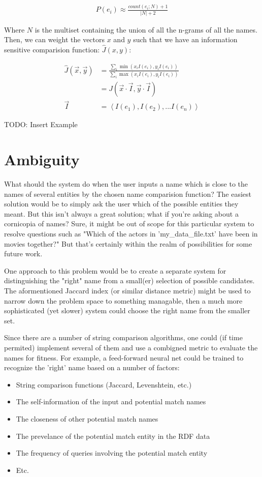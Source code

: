 \documentclass[11pt]{article}
\begin{document}
\begin{align*}
P(e_i) \approx \frac{count(e_i; N)+1}{|N|+2}
\end{align*}

Where $N$ is the multiset containing the union of all the n-grams of
all the names. 
Then, we can weight the vectors $x$ and $y$ such that we have
an information sensitive comparision function: $\hat{J}(x,y)$:

\begin{align*}
\hat{J}(\vec{x},\vec{y}) &= \frac{
    \sum_i \min(x_iI(e_i), y_iI(e_i))
}{
    \sum_i \max(x_iI(e_i), y_iI(e_i))
}\\
&= J\left(\vec{x} \cdot \vec{I}, \vec{y} \cdot \vec{I} \right)\\
\vec{I} &= \left< I(e_1), I(e_2), ... I(e_n) \right>
\end{align*}

TODO: Insert Example

\section{Ambiguity}
What should the system do when the user inputs a name which is close
to the names of several entities by the chosen name comparision
function? The easiest solution would be to simply ask the user which
of the possible entities they meant. But this isn't always a great
solution; what if you're asking about a cornicopia of names?
Sure, it might be out of scope for this particular system to
resolve questions such as "Which of the actors in 'my\_data\_file.txt'
have been in movies together?" But that's certainly within the
realm of possibilities for some future work.

One approach to this problem would be to create a separate
system for distinguishing the "right" name from a small(er) selection
of possible candidates. The aformentioned Jaccard index (or similar
distance metric) might be used to narrow down the problem space
to something managable, then a much more sophisticated (yet slower)
system could choose the right name from the smaller set.

Since there are a number of string comparison algorithms, one could
(if time permited) implement several of them and use a combigned
metric to evaluate the names for fitness. For example,
a feed-forward neural net could be trained to recognize the 'right'
name based on a number of factors:
\begin{itemize}
\item String comparison functions (Jaccard, Levenshtein, etc.)
\item The self-information \cite{shannon} of the input and potential match names
\item The closeness of other potential match names
\item The prevelance of the potential match entity in the RDF data
\item The frequency of queries involving the potential match entity
\item Etc.
\end{itemize}
\end{document}
